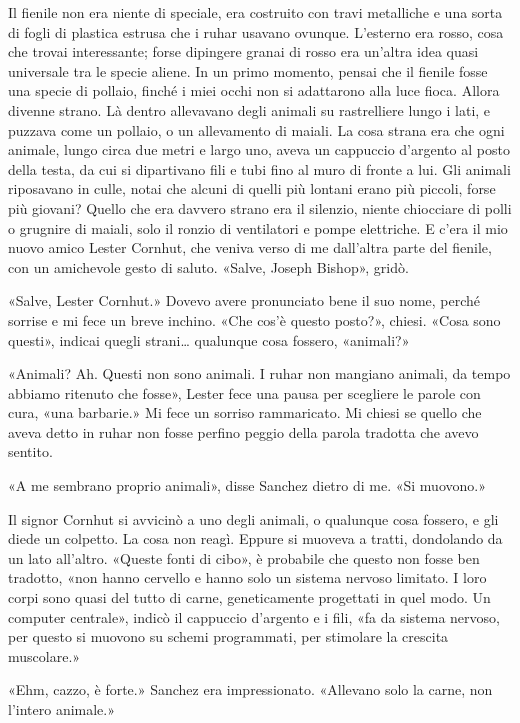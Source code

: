 Il fienile non era niente di speciale, era costruito con travi
metalliche e una sorta di fogli di plastica estrusa che i ruhar usavano
ovunque. L'esterno era rosso, cosa che trovai interessante; forse
dipingere granai di rosso era un'altra idea quasi universale tra le
specie aliene. In un primo momento, pensai che il fienile fosse una
specie di pollaio, finché i miei occhi non si adattarono alla luce
fioca. Allora divenne strano. Là dentro allevavano degli animali su
rastrelliere lungo i lati, e puzzava come un pollaio, o un allevamento
di maiali. La cosa strana era che ogni animale, lungo circa due metri e
largo uno, aveva un cappuccio d'argento al posto della testa, da cui si
dipartivano fili e tubi fino al muro di fronte a lui. Gli animali
riposavano in culle, notai che alcuni di quelli più lontani erano più
piccoli, forse più giovani? Quello che era davvero strano era il
silenzio, niente chiocciare di polli o grugnire di maiali, solo il
ronzio di ventilatori e pompe elettriche. E c'era il mio nuovo amico
Lester Cornhut, che veniva verso di me dall'altra parte del fienile, con
un amichevole gesto di saluto. «Salve, Joseph Bishop», gridò.

«Salve, Lester Cornhut.» Dovevo avere pronunciato bene il suo nome,
perché sorrise e mi fece un breve inchino. «Che cos'è questo posto?»,
chiesi. «Cosa sono questi», indicai quegli strani\ldots{} qualunque cosa
fossero, «animali?»

«Animali? Ah. Questi non sono animali. I ruhar non mangiano animali, da
tempo abbiamo ritenuto che fosse», Lester fece una pausa per scegliere
le parole con cura, «una barbarie.» Mi fece un sorriso rammaricato. Mi
chiesi se quello che aveva detto in ruhar non fosse perfino peggio della
parola tradotta che avevo sentito.

«A me sembrano proprio animali», disse Sanchez dietro di me. «Si
muovono.»

Il signor Cornhut si avvicinò a uno degli animali, o qualunque cosa
fossero, e gli diede un colpetto. La cosa non reagì. Eppure si muoveva a
tratti, dondolando da un lato all'altro. «Queste fonti di cibo», è
probabile che questo non fosse ben tradotto, «non hanno cervello e hanno
solo un sistema nervoso limitato. I loro corpi sono quasi del tutto di
carne, geneticamente progettati in quel modo. Un computer centrale»,
indicò il cappuccio d'argento e i fili, «fa da sistema nervoso, per
questo si muovono su schemi programmati, per stimolare la crescita
muscolare.»

«Ehm, cazzo, è forte.» Sanchez era impressionato. «Allevano solo la
carne, non l'intero animale.»

